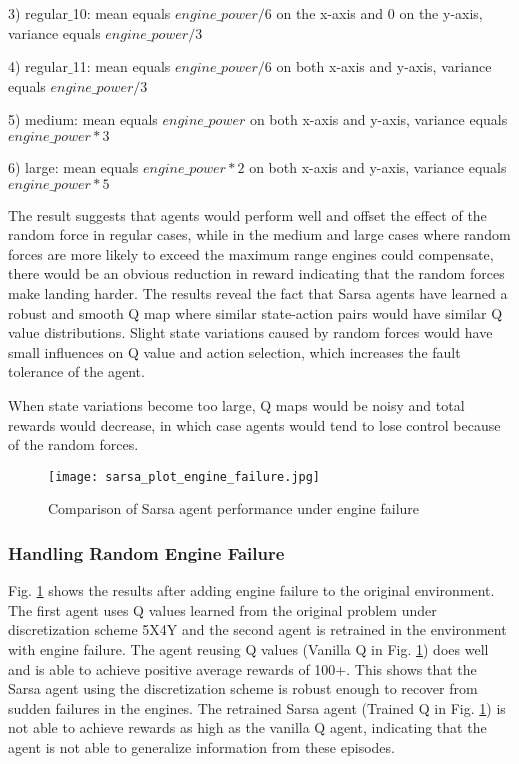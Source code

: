\documentclass[10pt, conference]{IEEEtran}
\begin{document}
3) regular$\_$10: mean equals $engine\_power/6$ on the x-axis and 0 on the y-axis, variance equals $engine\_power/3$ 

4) regular$\_$11: mean equals $engine\_power/6$ on both x-axis and y-axis, variance equals $engine\_power/3$ 

5) medium: mean equals $engine\_power$ on both x-axis and y-axis, variance equals $engine\_power*3$ 

6) large: mean equals $engine\_power*2$  on both x-axis and y-axis, variance equals $engine\_power*5$ 


The result suggests that agents would perform well and offset the effect of the random force in regular cases, while in the medium and large cases where random forces are more likely to exceed the maximum range engines could compensate, there would be an obvious reduction in reward indicating that the random forces make landing harder. The results reveal the fact that Sarsa agents have learned a robust and smooth Q map where similar state-action pairs would have similar Q value distributions. Slight state variations caused by random forces would have small influences on Q value and action selection, which increases the fault tolerance of the agent.

When state variations become too large, Q maps would be noisy and total rewards would decrease, in which case agents would tend to lose control because of the random forces.

\begin{figure}[!t]
    \centering
    \texttt{[image: sarsa\_plot\_engine\_failure.jpg]}
    \caption{Comparison of Sarsa agent performance under engine failure}
    \label{fig:sarsa_engine_fail}
\end{figure}
\subsubsection{Handling Random Engine Failure}
Fig. \ref{fig:sarsa_engine_fail} shows the results after adding engine failure to the original environment. The first agent uses Q values learned from the original problem under discretization scheme 5X4Y and the second agent is retrained in the environment with engine failure. The agent reusing Q values (Vanilla Q in Fig. \ref{fig:sarsa_engine_fail}) does well and is able to achieve positive average rewards of 100+. This shows that the Sarsa agent using the discretization scheme is robust enough to recover from sudden failures in the engines. The retrained Sarsa agent (Trained Q in Fig. \ref{fig:sarsa_engine_fail}) is not able to achieve rewards as high as the vanilla Q agent, indicating that the agent is not able to generalize information from these episodes. 
\end{document}
